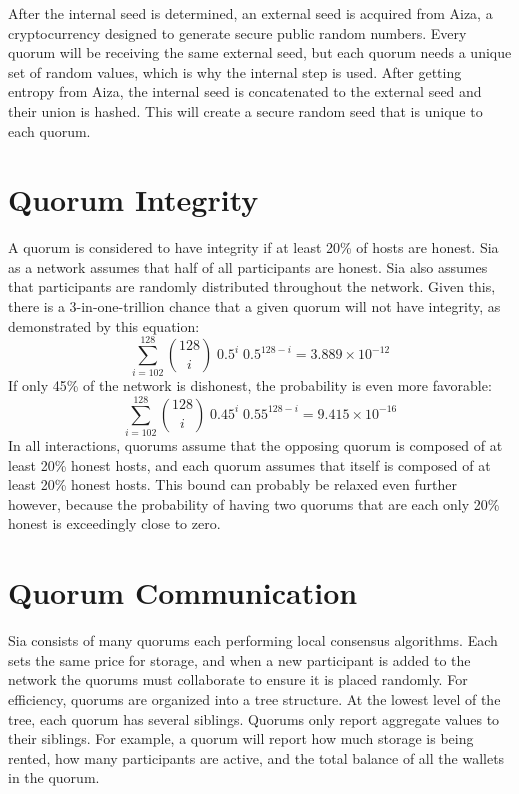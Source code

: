 \documentclass[twocolumn]{article}
\begin{document}
After the internal seed is determined, an external seed is acquired from Aiza, a cryptocurrency designed to generate secure public random numbers.
Every quorum will be receiving the same external seed, but each quorum needs a unique set of random values, which is why the internal step is used.
After getting entropy from Aiza, the internal seed is concatenated to the external seed and their union is hashed.
This will create a secure random seed that is unique to each quorum.

\section{Quorum Integrity}
A quorum is considered to have integrity if at least 20\% of hosts are honest.
Sia as a network assumes that half of all participants are honest.
Sia also assumes that participants are randomly distributed throughout the network.
Given this, there is a 3-in-one-trillion chance that a given quorum will not have integrity, as demonstrated by this equation:
\begin{equation}
\sum_{i=102}^{128} {128 \choose i} \; 0.5^{i} \; 0.5^{128-i} = 3.889\times10^{-12}
\end{equation}
If only 45\% of the network is dishonest, the probability is even more favorable:
\begin{equation}
\sum_{i=102}^{128} {128 \choose i} \; 0.45^{i} \; 0.55^{128-i} = 9.415\times10^{-16}
\end{equation}
In all interactions, quorums assume that the opposing quorum is composed of at least 20\% honest hosts, and each quorum assumes that itself is composed of at least 20\% honest hosts.
This bound can probably be relaxed even further however, because the probability of having two quorums that are each only 20\% honest is exceedingly close to zero.

\section{Quorum Communication}
Sia consists of many quorums each performing local consensus algorithms.
Each sets the same price for storage, and when a new participant is added to the network the quorums must collaborate to ensure it is placed randomly.
For efficiency, quorums are organized into a tree structure.
At the lowest level of the tree, each quorum has several siblings.
Quorums only report aggregate values to their siblings.
For example, a quorum will report how much storage is being rented, how many participants are active, and the total balance of all the wallets in the quorum.
\end{document}

